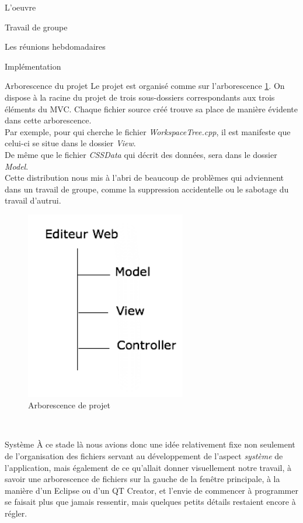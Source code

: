 \documentclass[a4paper, 12pt]{report}
\begin{document}
\begin{part}{L'oeuvre}
\begin{chapter}{Travail de groupe}
\begin{section}{Les réunions hebdomadaires}
			\end{section}
		\end{chapter}
		\begin{chapter}{Implémentation}
			\begin{section}{Arborescence du projet}
				Le projet est organisé comme sur l'arborescence \ref{dindon}. On dispose à la racine du projet de trois sous-dossiers correspondants
				aux trois éléments du \gls{MVC}. Chaque fichier source créé trouve sa place de manière évidente dans cette arborescence.\\
				Par exemple, pour qui cherche le fichier \emph{WorkspaceTree.cpp}, il est manifeste que celui-ci se situe dans le dossier \emph{View}.
				\\
				De même que le fichier \emph{CSSData} qui décrit des données, sera dans le dossier \emph{Model}.\\
				Cette distribution nous mis à l'abri de beaucoup de problèmes qui adviennent dans un travail de groupe, comme la suppression
				accidentelle ou le sabotage du travail d'autrui.\\

				\begin{figure}[h]
					\begin{center}
						\includegraphics[width=7cm]{images/arborescenceProjet.png}
						\caption{Arborescence de projet}
						\label{dindon}
					\end{center}
				\end{figure}~\\

			\end{section}

			\begin{section}{Système}
				À ce stade là nous avions donc une idée relativement fixe non seulement de l'organisation des fichiers servant au développement
				de l'aspect \emph{système} de l'application, mais également de ce qu'allait donner visuellement notre travail,
				à savoir une arborescence de fichiers sur la gauche de la fenêtre principale, à la manière d'un Eclipse ou d'un QT Creator,
				et l'envie de commencer à programmer se faisait plus que jamais ressentir, mais quelques petits détails restaient encore à régler.\\



\end{section}
\end{chapter}
\end{part}
\end{document}
